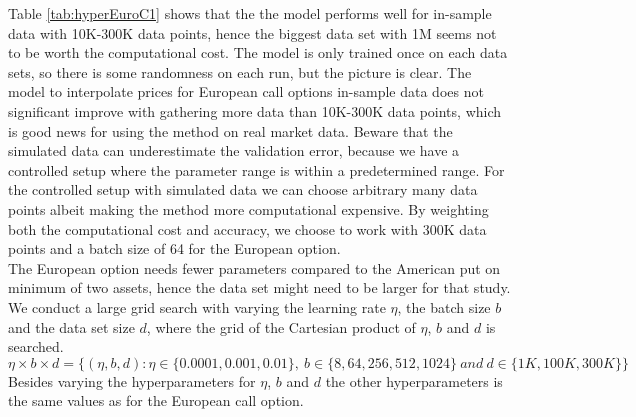 Table \ref{tab:hyperEuroC1} shows that the the model performs well for in-sample data with 10K-300K data points, hence the biggest data set with 1M seems not to be worth the computational cost. The model is only trained once on each data sets, so there is some randomness on each run, but the picture is clear. The model to interpolate prices for European call options in-sample data does not significant improve with gathering more data than 10K-300K data points, which is good news for using the method on real market data.  Beware that the simulated data can underestimate the validation error, because we have a controlled setup where the parameter range is within a predetermined range. For the controlled setup with simulated data we can choose arbitrary many data points albeit making the method more computational expensive. By weighting both the computational cost and accuracy, we choose to work with 300K data points and a batch size of 64 for the European option. \\

The European option needs fewer parameters compared to the American put on minimum of two assets, hence the data set might need to be larger for that study. We conduct a large grid search with varying the learning rate $\eta$, the batch size $b$ and the data set size $d$, where the grid of the Cartesian product of $\eta$, $b$ and $d$ is searched.
$$\eta \times b \times d = \{(\eta,b, d) : \eta \in \{0.0001, 0.001, 0.01 \}, \ b \in \{8, 64, 256, 512, 1024\} \ and \ d \in\{1K,100K,300K \} \}$$
Besides varying the hyperparameters for $\eta$, $b$ and $d$ the other hyperparameters is the same values as for the European call option.\\

